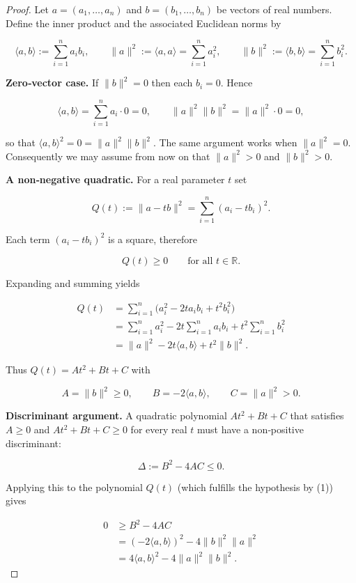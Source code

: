 \begin{proof}
Let \(a=(a_{1},\dots ,a_{n})\) and \(b=(b_{1},\dots ,b_{n})\) be vectors of real numbers.  
Define the inner product and the associated Euclidean norms by  

\[
\langle a,b\rangle :=\sum_{i=1}^{n}a_{i}b_{i},\qquad
\|a\|^{2}:=\langle a,a\rangle =\sum_{i=1}^{n}a_{i}^{2},\qquad
\|b\|^{2}:=\langle b,b\rangle =\sum_{i=1}^{n}b_{i}^{2}.
\]

\medskip\noindent\textbf{Zero‑vector case.}  
If \(\|b\|^{2}=0\) then each \(b_{i}=0\). Hence  

\[
\langle a,b\rangle =\sum_{i=1}^{n}a_{i}\cdot0 =0,\qquad
\|a\|^{2}\|b\|^{2}= \|a\|^{2}\cdot0 =0,
\]

so that \(\langle a,b\rangle^{2}=0=\|a\|^{2}\|b\|^{2}\).  
The same argument works when \(\|a\|^{2}=0\).  
Consequently we may assume from now on that \(\|a\|^{2}>0\) and \(\|b\|^{2}>0\).

\medskip\noindent\textbf{A non‑negative quadratic.}  
For a real parameter \(t\) set  

\[
Q(t):=\|a-tb\|^{2}
      =\sum_{i=1}^{n}(a_{i}-t b_{i})^{2}.
\]

Each term \((a_{i}-t b_{i})^{2}\) is a square, therefore  

\[
Q(t)\ge 0\qquad\text{for all }t\in\mathbb{R}. \tag{1}
\]

Expanding and summing yields  

\[
\begin{aligned}
Q(t) &=\sum_{i=1}^{n}\bigl(a_{i}^{2}-2t a_{i}b_{i}+t^{2}b_{i}^{2}\bigr)  \\
     &=\sum_{i=1}^{n}a_{i}^{2}-2t\sum_{i=1}^{n}a_{i}b_{i}+t^{2}\sum_{i=1}^{n}b_{i}^{2} \\
     &=\|a\|^{2}-2t\langle a,b\rangle + t^{2}\|b\|^{2}. \tag{2}
\end{aligned}
\]

Thus \(Q(t)=At^{2}+Bt+C\) with  

\[
A=\|b\|^{2}\ge0,\qquad B=-2\langle a,b\rangle ,\qquad C=\|a\|^{2}>0 .
\]

\medskip\noindent\textbf{Discriminant argument.}  
A quadratic polynomial \(At^{2}+Bt+C\) that satisfies \(A\ge0\) and \(At^{2}+Bt+C\ge0\) for every real \(t\) must have a non‑positive discriminant:

\[
\Delta:=B^{2}-4AC\le0.
\]

Applying this to the polynomial \(Q(t)\) (which fulfills the hypothesis by (1)) gives  

\[
\begin{aligned}
0 &\ge B^{2}-4AC \\
  &=(-2\langle a,b\rangle)^{2}-4\|b\|^{2}\|a\|^{2} \\
  &=4\langle a,b\rangle^{2}-4\|a\|^{2}\|b\|^{2}.
\end{aligned}
\]


\end{proof}
